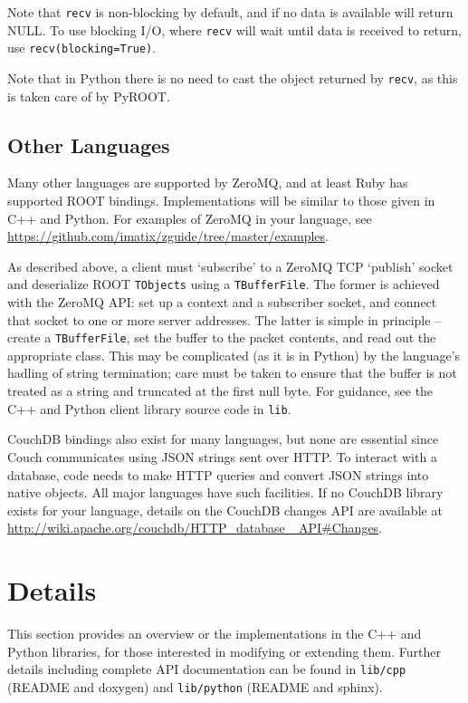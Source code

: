 \documentclass{article}
\begin{document}
Note that {\tt recv} is non-blocking by default, and if no data is available will return NULL. To use blocking I/O, where {\tt recv} will wait until data is received to return, use {\tt recv(blocking=True)}.

Note that in Python there is no need to cast the object returned by {\tt recv}, as this is taken care of by PyROOT.

\subsection{Other Languages}
Many other languages are supported by ZeroMQ, and at least Ruby has supported ROOT bindings. Implementations will be similar to those given in C++ and Python. For examples of ZeroMQ in your language, see \href{https://github.com/imatix/zguide/tree/master/examples}{https://github.com/imatix/zguide/tree/master/examples}.

As described above, a client must `subscribe' to a ZeroMQ TCP `publish' socket and deserialize ROOT {\tt TObjects} using a {\tt TBufferFile}. The former is achieved with the ZeroMQ API: set up a context and a subscriber socket, and connect that socket to one or more server addresses. The latter is simple in principle -- create a {\tt TBufferFile}, set the buffer to the packet contents, and read out the appropriate class. This may be complicated (as it is in Python) by the language's hadling of string termination; care must be taken to ensure that the buffer is not treated as a string and truncated at the first null byte. For guidance, see the C++ and Python client library source code in {\tt lib}.

CouchDB bindings also exist for many languages, but none are essential since Couch communicates using JSON strings sent over HTTP. To interact with a database, code needs to make HTTP queries and convert JSON strings into native objects. All major languages have such facilities. If no CouchDB library exists for your language, details on the CouchDB changes API are available at\\ \href{http://wiki.apache.org/couchdb/HTTP\_database\_API\#Changes}{http://wiki.apache.org/couchdb/HTTP\_database \_API\#Changes}.

\section{Details}
This section provides an overview or the implementations in the C++ and Python libraries, for those interested in modifying or extending them. Further details including complete API documentation can be found in {\tt lib/cpp} (README and doxygen) and {\tt lib/python} (README and sphinx).
\end{document}

